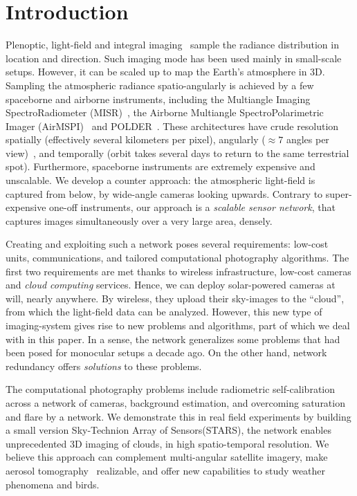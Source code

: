 \documentclass[runningheads]{llncs}
\begin{document}
\section{Introduction}

Plenoptic, light-field and integral imaging~\cite{Adelson1992,Basha2012,bishop,horstmeyer,Ng1948,kim,Stelamaris2014,Peng2014} sample the radiance distribution in location and direction. Such imaging mode has been used mainly in small-scale setups. However, it can be scaled up to map the Earth's atmosphere in 3D. Sampling the atmospheric radiance spatio-angularly is achieved by a few spaceborne and airborne instruments, including the Multiangle Imaging SpectroRadiometer (MISR)~\cite{diner,Diner1998}, the Airborne Multiangle SpectroPolarimetric Imager (AirMSPI)~\cite{dinerDavis07,dinerDavis10} and POLDER~\cite{baxter,breon,vanMol}.
These architectures have crude resolution spatially (effectively several kilometers per pixel), angularly ($\approx 7$ angles per view)~\cite{5753124}, and temporally (orbit takes several days to return to the same terrestrial spot). Furthermore, spaceborne instruments are extremely expensive and unscalable. We develop a counter approach: the atmospheric light-field is captured  from below, by wide-angle cameras looking upwards. Contrary to super-expensive one-off instruments, our approach is a {\em scalable sensor network}, that captures images simultaneously over a very large area, densely.

Creating and exploiting such a network poses several requirements: low-cost units,
communications, and tailored computational photography algorithms. The first two requirements are met  thanks to wireless infrastructure, low-cost cameras and {\em cloud computing} services. Hence, we can deploy solar-powered cameras at will, nearly anywhere. By wireless, they upload their sky-images to the ``cloud'', from which the light-field data can be analyzed. However, this new type of imaging-system gives rise to new problems and algorithms, part of which we deal with in this paper. In a sense, the network generalizes some problems that had been posed for monocular setups a decade ago. On the other hand, network redundancy offers {\em solutions} to these problems.

The computational photography problems include radiometric self-calibration across a network of cameras, background estimation, and overcoming saturation and flare by a network. We demonstrate this in real field experiments by building a small version Sky-Technion Array of Sensors(STARS), the network enables unprecedented 3D imaging of clouds, in high spatio-temporal resolution. We believe this approach can complement multi-angular satellite imagery, make aerosol tomography~\cite{Aides:13,Tomography2014} realizable, and offer new capabilities to study weather phenomena and birds.
\end{document}
